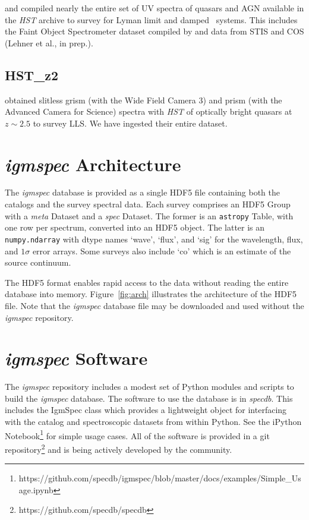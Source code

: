 \documentclass[12pt]{elsarticle}
\begin{document}
\cite{ribaudo11} and \cite{neeleman+16}
compiled nearly the entire set of UV spectra of 
quasars and AGN available in the {\it HST} archive
to survey for Lyman limit and damped \lya\ systems.
This includes the Faint Object Spectrometer dataset
compiled by \cite{bechtold02} and data from STIS
and COS (Lehner et al., in prep.).

\subsection{HST\_z2}
\label{sec:hstz2}

\cite{omeara11,omeara13} obtained slitless grism
(with the Wide Field Camera 3) and prism (with the
Advanced Camera for Science) spectra with {\it HST}
of optically bright quasars at $z \sim 2.5$
to survey LLS.  We have ingested their entire dataset.

\section{{\it igmspec} Architecture}
\label{sec:arch}

The {\it igmspec} database is provided as a single HDF5 file
containing both the catalogs and the survey spectral data.  
Each survey comprises an HDF5 Group
with a {\it meta} Dataset and a {\it spec} Dataset.
The former is an {\tt astropy} Table, with one row per
spectrum, converted into an HDF5 object.
The latter is an {\tt numpy.ndarray} 
with dtype names `wave', `flux', and `sig' for the
wavelength, flux, and $1\sigma$ error arrays.
Some surveys also include `co' which is an estimate of the source
continuum.  

The HDF5 format enables rapid access to the data without
reading the entire database into memory.  
Figure~\ref{fig:arch} illustrates the 
architecture of the HDF5 file.
Note that the {\it igmspec} database file may be
downloaded and used without the {\it igmspec}
repository.


\section{{\it igmspec} Software}
\label{sec:software}

The {\it igmspec} repository includes 
a modest set of Python modules and scripts to build the
{\it igmspec} database.  The software to use the
database is in {\it specdb}.
This includes the
IgmSpec class which provides a lightweight object for
interfacing with the catalog and spectroscopic datasets
from within Python.  See the iPython Notebook\footnote{
https://github.com/specdb/igmspec/blob/master/docs/examples/Simple\_Usage.ipynb}
for simple usage cases.
All of the software is provided in a git repository\footnote{
https://github.com/specdb/specdb}
and is being actively developed by the community.
\end{document}
